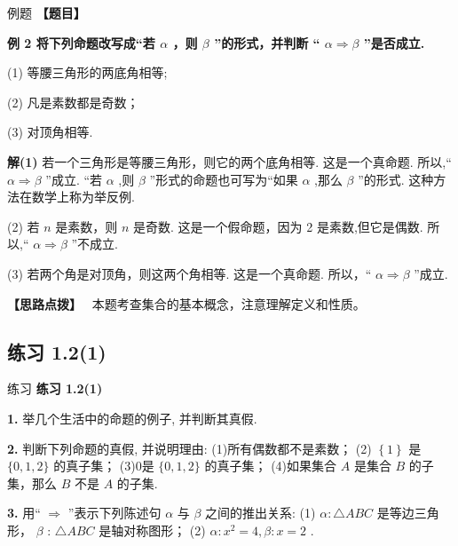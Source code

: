\documentclass[a4paper,10pt,oneside,fontset=none]{ctexbook}
\newcounter{example}[chapter]
\newenvironment{example}[1][]{\begin{exBox}{例题}{#1}}{\end{exBox}}
\newenvironment{exercise}[1][]{\begin{exBox}{练习}{#1}}{\end{exBox}}
\numberwithin{equation}{chapter}
\newenvironment{solution}{\begin{solutionBox}}{\end{solutionBox}}
\newenvironment{hint}{\begin{hintBox}\textbf{【思路点拨】}~}{\end{hintBox}}
\begin{document}
\begin{example}
\textbf{【题目】}\par\vspace{0.3em}
\textbf{例 2 将下列命题改写成“若 $\alpha$ ，则 $\beta$ ”的形式，并判断 “ $\alpha  \Rightarrow  \beta$ ”是否成立.}\par\vspace{0.3em}
\par
(1) 等腰三角形的两底角相等;
\par
(2) 凡是素数都是奇数；
\par
(3) 对顶角相等.
\end{example}

\begin{solution}
\textbf{解(1)} 若一个三角形是等腰三角形，则它的两个底角相等. 这是一个真命题. 所以,“ $\alpha  \Rightarrow  \beta$ ”成立.
“若 $\alpha$ ,则 $\beta$ ”形式的命题也可写为“如果 $\alpha$ ,那么 $\beta$ ”的形式.
这种方法在数学上称为举反例.
\par
(2) 若 $n$ 是素数，则 $n$ 是奇数. 这是一个假命题，因为 2 是素数,但它是偶数. 所以,“ $\alpha  \Rightarrow  \beta$ ”不成立.
\par
(3) 若两个角是对顶角，则这两个角相等. 这是一个真命题. 所以，“ $\alpha  \Rightarrow  \beta$ ”成立.
\end{solution}

\begin{hint}
本题考查集合的基本概念，注意理解定义和性质。
\end{hint}

\subsection*{练习 1.2(1)}

\begin{exercise}
\textbf{练习 1.2(1)}\par\vspace{0.5em}
\textbf{1.} 举几个生活中的命题的例子, 并判断其真假.
\par\vspace{0.8em}
\textbf{2.} 判断下列命题的真假, 并说明理由: (1)所有偶数都不是素数； (2) $\left\{  1\right\}$ 是 $\{ 0,1,2\}$ 的真子集； (3)0是 $\{ 0,1,2\}$ 的真子集； (4)如果集合 $A$ 是集合 $B$ 的子集，那么 $B$ 不是 $A$ 的子集.
\par\vspace{0.8em}
\textbf{3.} 用“ $\Rightarrow$ ”表示下列陈述句 $\alpha$ 与 $\beta$ 之间的推出关系: (1) $\alpha  : {\bigtriangleup {ABC}}$ 是等边三角形， $\beta$ : ${\bigtriangleup {ABC}}$ 是轴对称图形； (2) $\alpha  : {x}^{2} = 4,\beta  : x = 2$ .
\end{exercise}
\end{document}

